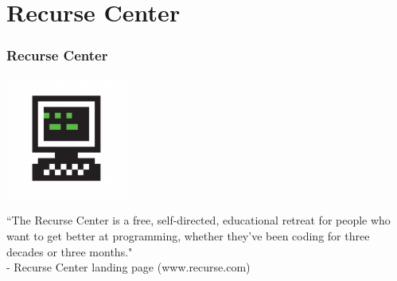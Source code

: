 \documentclass{beamer}
\theoremstyle{mystyle}
\begin{document}
\section{Recurse Center}
\frame{\tableofcontents[currentsection]}

\begin{frame}
\frametitle{Recurse Center}

\begin{center}
	\includegraphics[width=0.3\textwidth]{recurse_center.png}
\end{center}

\pause
\begin{center}
``The Recurse Center is a free, self-directed, educational retreat for people who want to get better at programming, whether they've been coding for three decades or three months." \\
- Recurse Center landing page (www.recurse.com)
\end{center}

\end{frame}

\end{document}
